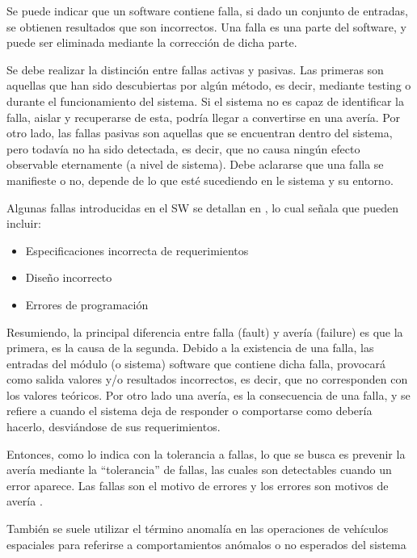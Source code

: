 Se puede indicar que un software contiene falla, si dado un conjunto de entradas, se obtienen
resultados que son incorrectos. Una falla es una parte del software, y puede ser eliminada mediante 
la corrección de dicha parte. \citep{XIE}

Se debe realizar la distinción entre fallas activas y pasivas. Las primeras son aquellas que han sido descubiertas por algún método, es decir, mediante testing o durante el funcionamiento del sistema. Si el sistema no es capaz de identificar la falla, aislar y recuperarse de esta, podría llegar a convertirse en una avería. Por otro lado, las fallas pasivas son aquellas que se encuentran dentro del sistema, pero todavía no ha sido detectada, es decir, que no causa ningún efecto observable eternamente (a nivel de sistema). Debe aclararse que una falla se manifieste o no, depende de lo que esté sucediendo en le sistema y su entorno. 

Algunas fallas introducidas en el \ac{SW} se detallan en \cite{Hanmer07}, lo cual señala que
pueden incluir:
\begin{itemize}
 \item Especificaciones incorrecta de requerimientos
 \item Diseño incorrecto
 \item Errores de programación
\end{itemize}


Resumiendo, la principal diferencia entre falla (fault) y avería (failure) es que la primera, es 
la causa de la segunda. Debido a la existencia de una falla, las entradas del módulo (o sistema) software
que contiene dicha falla, provocará como salida valores y/o resultados incorrectos, es decir, 
que no corresponden con los valores teóricos. Por otro lado una avería, es la consecuencia de una falla, 
y se refiere a cuando el sistema deja de responder o comportarse como debería hacerlo, desviándose 
de sus requerimientos. 

Entonces, como lo indica \cite{Pullum01} con la tolerancia a fallas, lo que se busca es prevenir la
avería mediante la ``tolerancia'' de fallas, las cuales son detectables cuando un error aparece.
Las fallas son el motivo de errores y los errores son motivos de avería \citep{FTDesign}.

También se suele utilizar el término anomalía en las operaciones de vehículos espaciales para
referirse a comportamientos anómalos o no esperados del sistema \citep{SpaceSystemFailures}

